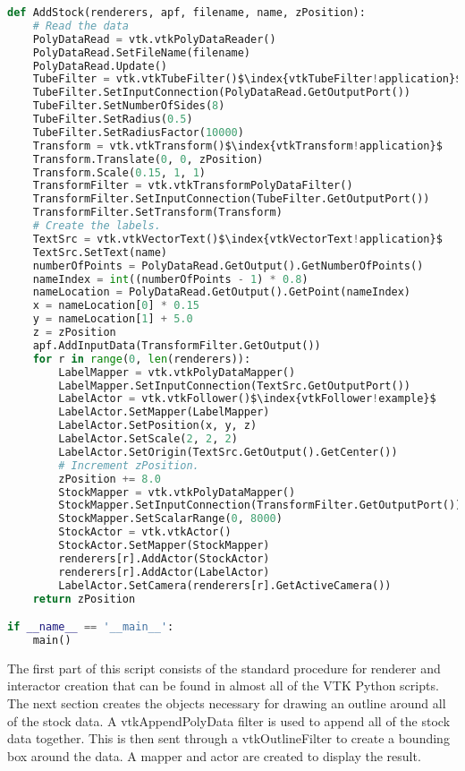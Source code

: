 \begin{lstlisting}[language=Python, caption={Stocks1.py}, escapechar=\$]
def AddStock(renderers, apf, filename, name, zPosition):
    # Read the data
    PolyDataRead = vtk.vtkPolyDataReader()
    PolyDataRead.SetFileName(filename)
    PolyDataRead.Update()
    TubeFilter = vtk.vtkTubeFilter()$\index{vtkTubeFilter!application}$
    TubeFilter.SetInputConnection(PolyDataRead.GetOutputPort())
    TubeFilter.SetNumberOfSides(8)
    TubeFilter.SetRadius(0.5)
    TubeFilter.SetRadiusFactor(10000)
    Transform = vtk.vtkTransform()$\index{vtkTransform!application}$
    Transform.Translate(0, 0, zPosition)
    Transform.Scale(0.15, 1, 1)
    TransformFilter = vtk.vtkTransformPolyDataFilter()
    TransformFilter.SetInputConnection(TubeFilter.GetOutputPort())
    TransformFilter.SetTransform(Transform)
    # Create the labels.
    TextSrc = vtk.vtkVectorText()$\index{vtkVectorText!application}$
    TextSrc.SetText(name)
    numberOfPoints = PolyDataRead.GetOutput().GetNumberOfPoints()
    nameIndex = int((numberOfPoints - 1) * 0.8)
    nameLocation = PolyDataRead.GetOutput().GetPoint(nameIndex)
    x = nameLocation[0] * 0.15
    y = nameLocation[1] + 5.0
    z = zPosition
    apf.AddInputData(TransformFilter.GetOutput())
    for r in range(0, len(renderers)):
        LabelMapper = vtk.vtkPolyDataMapper()
        LabelMapper.SetInputConnection(TextSrc.GetOutputPort())
        LabelActor = vtk.vtkFollower()$\index{vtkFollower!example}$
        LabelActor.SetMapper(LabelMapper)
        LabelActor.SetPosition(x, y, z)
        LabelActor.SetScale(2, 2, 2)
        LabelActor.SetOrigin(TextSrc.GetOutput().GetCenter())
        # Increment zPosition.
        zPosition += 8.0
        StockMapper = vtk.vtkPolyDataMapper()
        StockMapper.SetInputConnection(TransformFilter.GetOutputPort())
        StockMapper.SetScalarRange(0, 8000)
        StockActor = vtk.vtkActor()
        StockActor.SetMapper(StockMapper)
        renderers[r].AddActor(StockActor)
        renderers[r].AddActor(LabelActor)
        LabelActor.SetCamera(renderers[r].GetActiveCamera())
    return zPosition

if __name__ == '__main__':
    main()

\end{lstlisting}

\noindent The first part of this script consists of the standard procedure for renderer and interactor creation that can be found in almost all of the VTK Python scripts. The next section creates the objects necessary for drawing an outline around all of the stock data. A vtkAppendPolyData filter is used to append all of the stock data together. This is then sent through a vtkOutlineFilter to create a bounding box around the data. A mapper and actor are created to display the result.

